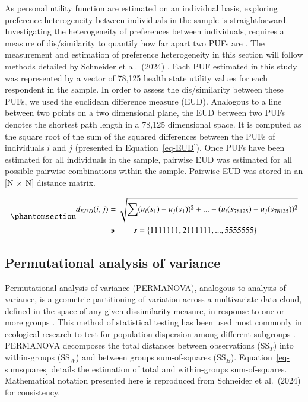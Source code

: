 \documentclass[
  number,
  preprint]{elsarticle}
\begin{document}
As personal utility function are estimated on an individual basis,
exploring preference heterogeneity between individuals in the sample is
straightforward. Investigating the heterogeneity of preferences between
individuals, requires a measure of dis/similarity to quantify how far
apart two PUFs are \citep{Schneider2024ExploringLevel}. The measurement
and estimation of preference heterogeneity in this section will follow
methods detailed by Schneider et al.~(2024)
\citep{Schneider2024ExploringLevel}. Each PUF estimated in this study
was represented by a vector of 78,125 health state utility values for
each respondent in the sample. In order to assess the dis/similarity
between these PUFs, we used the euclidean difference measure (EUD).
Analogous to a line between two points on a two dimensional plane, the
EUD between two PUFs denotes the shortest path length in a 78,125
dimensional space. It is computed as the square root of the sum of the
squared differences between the PUFs of individuals \(i\) and \(j\)
(presented in Equation~\ref{eq-EUD}). Once PUFs have been estimated for
all individuals in the sample, pairwise EUD was estimated for all
possible pairwise combinations within the sample. Pairwise EUD was
stored in an {[}N \(\times\) N{]} distance matrix.

\begin{equation}\phantomsection\label{eq-EUD}{ 
  \begin{aligned}
    d_{EUD}(i,j) & =\sqrt{\sum_{}^{}(u_{i}(s_{1})-u_{j}(s_{1}))^{2}+ ... +(u_{i}(s_{78125})-u_{j}(s_{78125}))^{2}}\\
      & \backepsilon \quad \quad s = \{1111111, 2111111, ..., 5555555\}\\
  \end{aligned}
}\end{equation}

\subsection{Permutational analysis of
variance}\label{permutational-analysis-of-variance}

Permutational analysis of variance (PERMANOVA), analogous to analysis of
variance, is a geometric partitioning of variation across a multivariate
data cloud, defined in the space of any given dissimilarity measure, in
response to one or more groups
\citep{Anderson2017, Anderson2013PERMANOVATesting}. This method of
statistical testing has been used most commonly in ecological research
to test for population dispersion among different subgroups
\citep{Souza2013PopulationEstuary}. PERMANOVA decomposes the total
distances between observations (SS\(_T\)) into within-groups (SS\(_W\))
and between groups sum-of-squares (SS\(_B\)).
Equation~\ref{eq-sumsquares} details the estimation of total and
within-groups sum-of-squares. Mathematical notation presented here is
reproduced from Schneider et al.~(2024)
\citep{Schneider2024ExploringLevel} for consistency.
\end{document}
